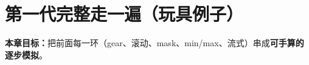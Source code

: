 \chapter{第一代完整走一遍（玩具例子）}
\label{ch:gen1-walkthrough}

\noindent\textbf{本章目标：}把前面每一环（gear、滚动、mask、min/max、流式）串成\textbf{可手算的逐步模拟}。


